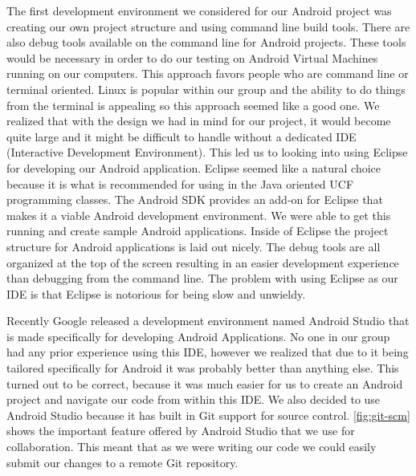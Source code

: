 The first development environment we considered for our Android project was
creating our own project structure and using command line build tools. There
are also debug tools available on the command line for Android projects. These
tools would be necessary in order to do our testing on Android Virtual Machines
running on our computers. This approach favors people who are command line or
terminal oriented. Linux is popular within our group and the ability to do
things from the terminal is appealing so this approach seemed like a good one.
We realized that with the design we had in mind for our project, it would
become quite large and it might be difficult to handle without a dedicated IDE
(Interactive Development Environment). This led us to looking into using
Eclipse for developing our Android application. Eclipse seemed like a natural
choice because it is what is recommended for using in the Java oriented UCF
programming classes.  The Android SDK provides an add{}-on for Eclipse that
makes it a viable Android development environment. We were able to get this
running and create sample Android applications. Inside of Eclipse the project
structure for Android applications is laid out nicely. The debug tools are all
organized at the top of the screen resulting in an easier development
experience than debugging from the command line. The problem with using Eclipse
as our IDE is that Eclipse is notorious for being slow and unwieldy.

\color{black} Recently Google released a development environment named Android
Studio that is made specifically for developing Android Applications. No one in
our group had any prior experience using this IDE, however we realized that due
to it being tailored specifically for Android it was probably better than
anything else. This turned out to be correct, because it was much easier for us
to create an Android project and navigate our code from within this IDE. We
also decided to use Android Studio because it has built in Git support for
source control. \autoref{fig:git-scm} shows the important feature offered by
Android Studio that we use for collaboration. This meant that as we were
writing our code we could easily submit our changes to a remote Git repository.



